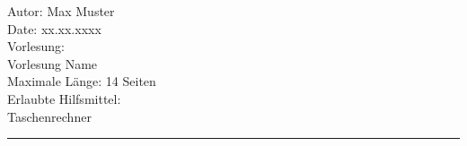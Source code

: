 Autor: Max Muster\\
Date: xx.xx.xxxx\\
Vorlesung:\\
Vorlesung Name\\
Maximale Länge: 14 Seiten\\
Erlaubte Hilfsmittel:\\
Taschenrechner\\
\hrule

